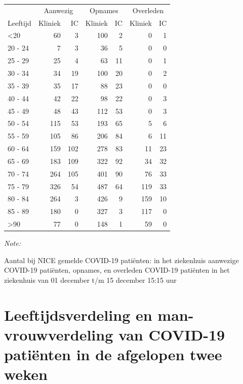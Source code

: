 \documentclass[
  english,
  man,floatsintext]{apa6}
\begin{document}
\begin{table}
\centering\begingroup\fontsize{10}{12}\selectfont

\begin{threeparttable}
\begin{tabular}{lrrrrrr}
\toprule
\multicolumn{1}{c}{ } & \multicolumn{2}{c}{Aanwezig} & \multicolumn{2}{c}{Opnames} & \multicolumn{2}{c}{Overleden} \\
\cmidrule(l{3pt}r{3pt}){2-3} \cmidrule(l{3pt}r{3pt}){4-5} \cmidrule(l{3pt}r{3pt}){6-7}
Leeftijd & Kliniek & IC & Kliniek & IC & Kliniek & IC\\
\midrule
<20 & 60 & 3 & 100 & 2 & 0 & 1\\
20 - 24 & 7 & 3 & 36 & 5 & 0 & 0\\
25 - 29 & 25 & 4 & 63 & 11 & 0 & 1\\
30 - 34 & 34 & 19 & 100 & 20 & 0 & 2\\
35 - 39 & 35 & 17 & 88 & 23 & 0 & 0\\
40 - 44 & 42 & 22 & 98 & 22 & 0 & 3\\
45 - 49 & 48 & 43 & 112 & 53 & 0 & 3\\
50 - 54 & 115 & 53 & 193 & 65 & 5 & 6\\
55 - 59 & 105 & 86 & 206 & 84 & 6 & 11\\
60 - 64 & 159 & 102 & 278 & 83 & 11 & 23\\
65 - 69 & 183 & 109 & 322 & 92 & 34 & 32\\
70 - 74 & 264 & 105 & 401 & 90 & 76 & 33\\
75 - 79 & 326 & 54 & 487 & 64 & 119 & 33\\
80 - 84 & 264 & 3 & 426 & 9 & 159 & 10\\
85 - 89 & 180 & 0 & 327 & 3 & 117 & 0\\
>90 & 77 & 0 & 148 & 1 & 59 & 0\\
\bottomrule
\end{tabular}
\begin{tablenotes}
\item \textit{Note: } 
\item Aantal bij NICE gemelde COVID-19 patiënten: in het ziekenhuis aanwezige COVID-19 patiënten, opnames, en overleden COVID-19 patiënten in het ziekenhuis van 01 december t/m 15 december 15:15 uur
\end{tablenotes}
\end{threeparttable}
\endgroup{}
\end{table}

\newpage

\hypertarget{leeftijdsverdeling-en-man-vrouwverdeling-van-covid-19-patiuxebnten-in-de-afgelopen-twee-weken}{%
\section{Leeftijdsverdeling en man-vrouwverdeling van COVID-19 patiënten in de afgelopen twee weken}\label{leeftijdsverdeling-en-man-vrouwverdeling-van-covid-19-patiuxebnten-in-de-afgelopen-twee-weken}}
\end{document}
